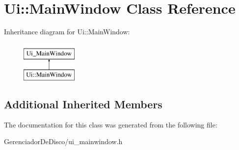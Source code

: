 \hypertarget{classUi_1_1MainWindow}{}\section{Ui\+:\+:Main\+Window Class Reference}
\label{classUi_1_1MainWindow}
Inheritance diagram for Ui\+:\+:Main\+Window\+:\begin{figure}[H]
\begin{center}
\leavevmode
\includegraphics[height=2.000000cm]{classUi_1_1MainWindow}
\end{center}
\end{figure}
\subsection*{Additional Inherited Members}


The documentation for this class was generated from the following file\+:\begin{DoxyCompactItemize}
\item 
Gerenciador\+De\+Disco/ui\+\_\+mainwindow.\+h\end{DoxyCompactItemize}
